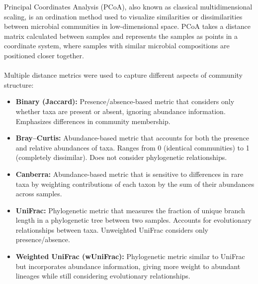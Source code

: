 \documentclass[10pt]{article}
\begin{document}
Principal Coordinates Analysis (PCoA), also known as classical multidimensional scaling, is an ordination method used to visualize similarities or dissimilarities between microbial communities in low-dimensional space. PCoA takes a distance matrix calculated between samples and represents the samples as points in a coordinate system, where samples with similar microbial compositions are positioned closer together.
\\ \\
Multiple distance metrics were used to capture different aspects of community structure:
\begin{itemize}
  \item \textbf{Binary (Jaccard):} Presence/absence-based metric that considers only whether taxa are present or absent, ignoring abundance information. Emphasizes differences in community membership.

  \item \textbf{Bray--Curtis:} Abundance-based metric that accounts for both the presence and relative abundances of taxa. Ranges from 0 (identical communities) to 1 (completely dissimilar). Does not consider phylogenetic relationships.

  \item \textbf{Canberra:} Abundance-based metric that is sensitive to differences in rare taxa by weighting contributions of each taxon by the sum of their abundances across samples.

  \item \textbf{UniFrac:} Phylogenetic metric that measures the fraction of unique branch length in a phylogenetic tree between two samples. Accounts for evolutionary relationships between taxa. Unweighted UniFrac considers only presence/absence.

  \item \textbf{Weighted UniFrac (wUniFrac):} Phylogenetic metric similar to UniFrac but incorporates abundance information, giving more weight to abundant lineages while still considering evolutionary relationships.
\end{itemize}
\end{document}
